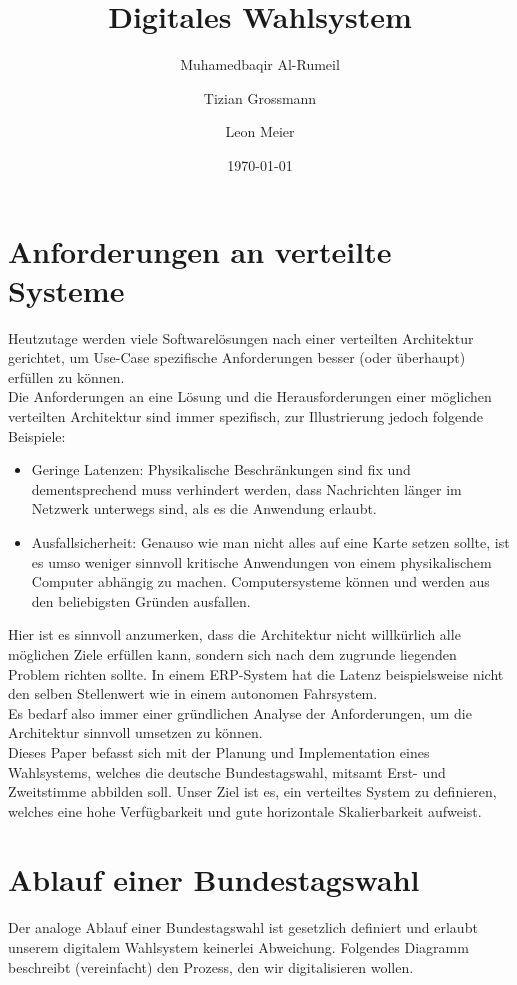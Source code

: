 \documentclass{article}  %
\title{Digitales Wahlsystem}
\author{
    Muhamedbaqir Al-Rumeil \and 
    Tizian Grossmann \and 
    Leon Meier
    }
\date{\today}  %
\begin{document}
\maketitle
\newpage

\tableofcontents
\newpage

\section{Anforderungen an verteilte Systeme}

Heutzutage werden viele Softwarelösungen nach einer verteilten Architektur gerichtet, um Use-Case spezifische Anforderungen besser (oder überhaupt) erfüllen zu können. \\
Die Anforderungen an eine Lösung und die Herausforderungen einer möglichen verteilten Architektur sind immer spezifisch, zur Illustrierung jedoch folgende Beispiele: 
\begin{itemize}
    \item Geringe Latenzen: Physikalische Beschränkungen sind fix und dementsprechend muss verhindert werden, dass Nachrichten länger im Netzwerk unterwegs sind, als es die Anwendung erlaubt.

    \item Ausfallsicherheit: Genauso wie man nicht alles auf eine Karte setzen sollte, ist es umso weniger sinnvoll kritische Anwendungen von einem physikalischem Computer abhängig zu machen. Computersysteme können und werden aus den beliebigsten Gründen ausfallen.
\end{itemize} 

Hier ist es sinnvoll anzumerken, dass die Architektur nicht willkürlich alle möglichen Ziele erfüllen kann, sondern sich nach dem zugrunde liegenden Problem richten sollte. In einem ERP-System hat die Latenz beispielsweise nicht den selben Stellenwert wie in einem autonomen Fahrsystem. \\
Es bedarf also immer einer gründlichen Analyse der Anforderungen, um die Architektur sinnvoll umsetzen zu können. \\


Dieses Paper befasst sich mit der Planung und Implementation eines Wahlsystems, welches die deutsche Bundestagswahl, mitsamt Erst- und Zweitstimme abbilden soll. Unser Ziel ist es, ein verteiltes System zu definieren, welches eine hohe Verfügbarkeit und gute horizontale Skalierbarkeit aufweist.
  
\newpage

\section{Ablauf einer Bundestagswahl}
Der analoge Ablauf einer Bundestagswahl ist gesetzlich definiert und erlaubt unserem digitalem Wahlsystem keinerlei Abweichung. Folgendes Diagramm beschreibt (vereinfacht) den Prozess, den wir digitalisieren wollen. \\
\end{document}
